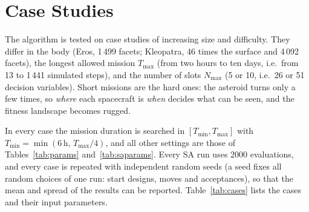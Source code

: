\chapter{Case Studies}
\label{ch:cases}

The algorithm is tested on case studies of increasing size and difficulty. They differ in the
body (Eros, 1\,499 facets; Kleopatra, 46 times the surface and 4\,092 facets), the longest allowed
mission $T_{\max}$ (from two hours to ten days, i.e.\ from 13 to 1\,441 simulated steps), and the
number of slots $N_{\max}$ (5 or 10, i.e.\ 26 or 51 decision variables). Short missions are the
hard ones: the asteroid turns only a few times, so \emph{where} each spacecraft is \emph{when}
decides what can be seen, and the fitness landscape becomes rugged.

In every case the mission duration is searched in $[T_{\min},T_{\max}]$ with
$T_{\min}=\min(6\,\mathrm{h},\,T_{\max}/4)$, and all other settings are those of
Tables~\ref{tab:params} and~\ref{tab:saparams}. Every \ac{SA} run uses 2000 evaluations, and every
case is repeated with independent random seeds (a seed fixes all random choices of one run:
start designs, moves and acceptances), so that the mean and spread of the results can be
reported. Table~\ref{tab:cases} lists the cases and their input parameters.

